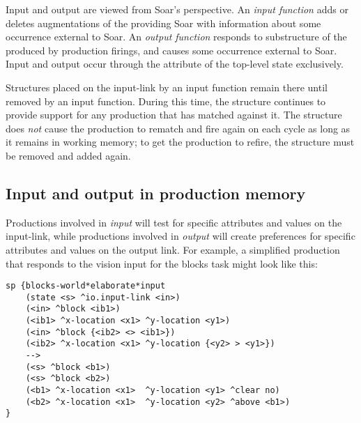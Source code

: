 Input and output are viewed from Soar's perspective. An \emph{input
function} adds or deletes augmentations of the  
providing Soar with information about some occurrence external to Soar. An
\emph{output function} responds to substructure of the 
produced by production firings, and causes some occurrence external to
Soar. Input and output occur through the  attribute of the top-level
state exclusively.

Structures placed on the input-link by an input function remain there until removed
by an input function. During this time, the structure continues to provide support for
any production that has matched against it. The structure does \emph{not} cause the production
to rematch and fire again on each cycle as long as it remains in working memory;
to get the production to refire, the structure must be removed and added again.





\subsection{Input and output in production memory}
\label{ADVANCED-io-pm}

Productions involved in \emph{input} will test for specific attributes and
values on the input-link, while productions involved in \emph{output} will
create preferences for specific attributes and values on the output link.
For example, a simplified production that responds to the vision input 
for the blocks task might look like this:

\begin{verbatim}
sp {blocks-world*elaborate*input
    (state <s> ^io.input-link <in>)
    (<in> ^block <ib1>)
    (<ib1> ^x-location <x1> ^y-location <y1>)
    (<in> ^block {<ib2> <> <ib1>})
    (<ib2> ^x-location <x1> ^y-location {<y2> > <y1>})
    -->
    (<s> ^block <b1>)
    (<s> ^block <b2>)
    (<b1> ^x-location <x1>  ^y-location <y1> ^clear no)
    (<b2> ^x-location <x1>  ^y-location <y2> ^above <b1>)
}
\end{verbatim}  \vspace{12pt}

